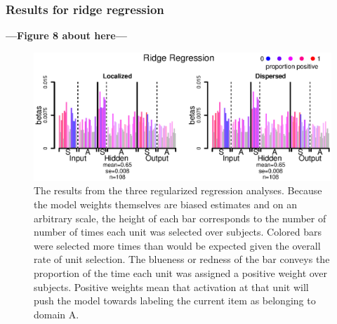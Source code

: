 \subsubsection{Results for ridge regression}
\textbf{---Figure 8 about here---}
\begin{figure}
\centering
\includegraphics[width=1\textwidth]{figures/ridge_only.eps}
\caption{\label{fig.ridge} The results from the three regularized regression analyses. Because the model weights themselves are biased estimates and on an arbitrary scale, the height of each bar corresponds to the number of number of times each unit was selected over subjects. Colored bars were selected more times than would be expected given the overall rate of unit selection. The blueness or redness of the bar conveys the proportion of the time each unit was assigned a positive weight over subjects. Positive weights mean that activation at that unit will push the model towards labeling the current item as belonging to domain A.}
\end{figure}

